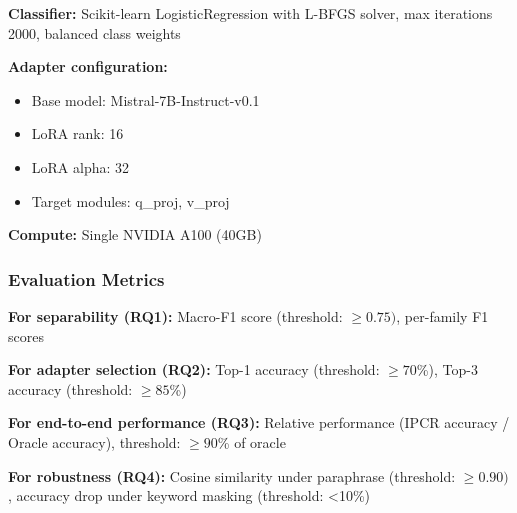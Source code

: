 \textbf{Classifier:} Scikit-learn LogisticRegression with L-BFGS solver, max iterations 2000, balanced class weights

\textbf{Adapter configuration:}
\begin{itemize}
\item Base model: Mistral-7B-Instruct-v0.1
\item LoRA rank: 16
\item LoRA alpha: 32
\item Target modules: q\_proj, v\_proj
\end{itemize}

\textbf{Compute:} Single NVIDIA A100 (40GB)

\subsubsection{Evaluation Metrics}

\textbf{For separability (RQ1):} Macro-F1 score (threshold: $\geq 0.75)$, per-family F1 scores

\textbf{For adapter selection (RQ2):} Top-1 accuracy (threshold: $\geq 70$\%), Top-3 accuracy (threshold: $\geq 85$\%)

\textbf{For end-to-end performance (RQ3):} Relative performance (IPCR accuracy / Oracle accuracy), threshold: $\geq 90$\% of oracle

\textbf{For robustness (RQ4):} Cosine similarity under paraphrase (threshold: $\geq 0.90)$, accuracy drop under keyword masking (threshold: <10\%)
